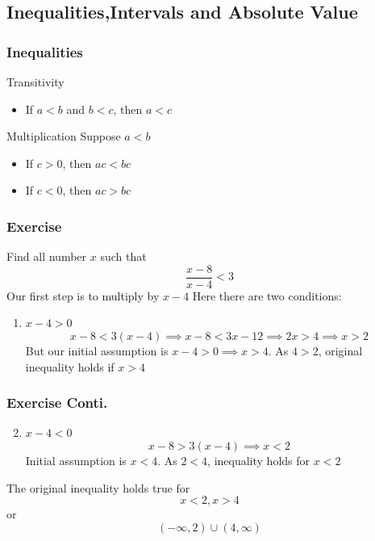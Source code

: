 \documentclass{beamer}
\begin{document}
\subsection{Inequalities,Intervals and Absolute Value}
\begin{frame}
  \frametitle{Inequalities}
  \begin{block}{Transitivity}
    \begin{itemize}
        \item If $a < b$ and $b < c$, then $a < c$
      \end{itemize}
  \end{block}

  \begin{block}{Multiplication}
    Suppose $a < b$
    \begin{itemize}
      \item If $c > 0$, then $ac < bc$
      \item If $c <  0$, then $ ac > bc$
    \end{itemize}
  \end{block}
\end{frame} 

\begin{frame}
  \frametitle{Exercise }
  Find all number \( x \) such that 
  \[\frac{x-8}{x-4} < 3 \] 
Our first step  is to multiply by \(x-4\)
Here there are two conditions:
\begin{enumerate}
  \item \( x-4 > 0 \) 
  \[ x -8 < 3(x-4)  \implies x-8 < 3x-12 \implies 2x > 4  \implies x > 2\]
  But our initial assumption is \(x-4 > 0 \implies x > 4 \). As \( 4 > 2 \), original inequality holds if \( x > 4\)
\end{enumerate} 
\end{frame}

\begin{frame}
  \frametitle{Exercise Conti.}
\begin{enumerate}
  \setcounter{enumi}{1}
  \item \( x-4 < 0 \) 
  \[ x-8 > 3(x-4) \implies  x < 2 \] 
  Initial assumption is \( x<4 \). As \( 2 < 4\), inequality holds for \( x < 2 \)
\end{enumerate}

The original inequality holds true for \[x < 2 ,  x > 4 \]   
or 
\[  (-\infty, 2) \cup (4,\infty) \]

\end{frame}
\end{document}
